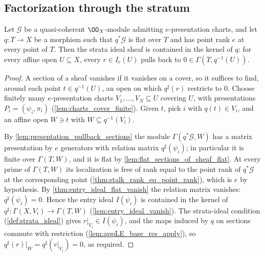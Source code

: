 \subsection{Factorization through the stratum}

\begin{theorem}
  \label{thm:strata_ideal_le_ker}
  \leanok
  Let \(\mathcal G\) be a quasi-coherent \(\OO_X\)-module admitting
  \(e\)-presentation charts, and let \(q : T \to X\) be a morphism such that
  \(q^*\mathcal G\) is flat over \(T\) and has point rank \(e\) at every
  point of \(T\).  Then the strata ideal sheaf is contained in the kernel of
  \(q\): for every affine open \(U \subseteq X\), every \(r \in I_e(U)\)
  pulls back to \(0 \in \Gamma(T, q^{-1}(U))\).
\end{theorem}

\begin{proof}
  \leanok
  A section of a sheaf vanishes if it vanishes on a cover, so it suffices to
  find, around each point \(t \in q^{-1}(U)\), an open on which
  \(q^\sharp(r)\) restricts to \(0\).  Choose finitely many
  \(e\)-presentation charts \(V_1, \dots, V_N \subseteq U\) covering \(U\),
  with presentations \(P_i = (\psi_i, \pi_i)\)
  (\cref{lem:charts_cover_finite}).  Given \(t\), pick \(i\) with
  \(q(t) \in V_i\), and an affine open \(W \ni t\) with
  \(W \subseteq q^{-1}(V_i)\).

  By \cref{lem:presentation_pullback_sections} the module
  \(\Gamma(q^*\mathcal G, W)\) has a matrix presentation by \(e\) generators
  with relation matrix \(q^\sharp(\psi_i)\); in particular it is finite over
  \(\Gamma(T, W)\), and it is flat by
  \cref{lem:flat_sections_of_sheaf_flat}.  At every prime of
  \(\Gamma(T, W)\) its localization is free of rank equal to the point rank
  of \(q^*\mathcal G\) at the corresponding point
  (\cref{thm:stalk_rank_eq_point_rank}), which is \(e\) by hypothesis.  By
  \cref{thm:entry_ideal_flat_vanish} the relation matrix vanishes:
  \(q^\sharp(\psi_i) = 0\).  Hence the entry ideal \(I(\psi_i)\) is
  contained in the kernel of
  \(q^\sharp : \Gamma(X, V_i) \to \Gamma(T, W)\)
  (\cref{lem:entry_ideal_vanish}).  The strata-ideal condition
  (\cref{def:strata_ideal}) gives \(r|_{V_i} \in I(\psi_i)\), and the maps
  induced by \(q\) on sections commute with restriction
  (\cref{lem:appLE_base_res_apply}), so
  \(q^\sharp(r)|_W = q^\sharp(r|_{V_i}) = 0\), as required.
\end{proof}


